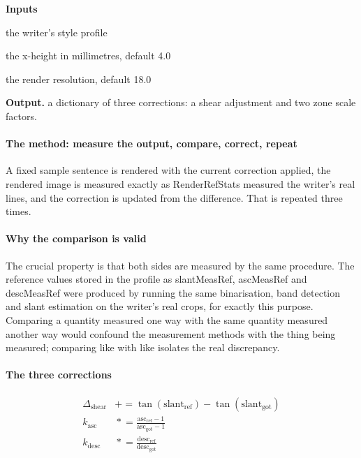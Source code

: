 \noindent\textbf{Inputs}
\begin{description}[leftmargin=2.2em,style=nextline,font=\normalfont\ttfamily]\setlength\itemsep{1pt}
  \item[{profile}] \normalfont the writer's style profile
  \item[{mmPerXh}] \normalfont the x-height in millimetres, default 4.0
  \item[{pxPerMm}] \normalfont the render resolution, default 18.0
\end{description}

\noindent\textbf{Output.} a dictionary of three corrections: a shear adjustment and two zone scale factors.


\paragraph{The method: measure the output, compare, correct, repeat}
A fixed sample sentence is rendered with the current correction applied, the rendered image is measured exactly as RenderRefStats measured the writer's real lines, and the correction is updated from the difference. That is repeated three times.


\paragraph{Why the comparison is valid}
The crucial property is that both sides are measured by the same procedure. The reference values stored in the profile as slantMeasRef, ascMeasRef and descMeasRef were produced by running the same binarisation, band detection and slant estimation on the writer's real crops, for exactly this purpose. Comparing a quantity measured one way with the same quantity measured another way would confound the measurement methods with the thing being measured; comparing like with like isolates the real discrepancy.


\paragraph{The three corrections}

\begin{equation}
\begin{aligned} \Delta_{\mathrm{shear}} &\mathrel{+}= \tan(\mathrm{slant}_{\mathrm{ref}}) - \tan(\mathrm{slant}_{\mathrm{got}}) \\[3pt] k_{\mathrm{asc}} &\mathrel{\ast}= \frac{\mathrm{asc}_{\mathrm{ref}} - 1}{\mathrm{asc}_{\mathrm{got}} - 1} \\[3pt] k_{\mathrm{desc}} &\mathrel{\ast}= \frac{\mathrm{desc}_{\mathrm{ref}}}{\mathrm{desc}_{\mathrm{got}}} \end{aligned}
\end{equation}

